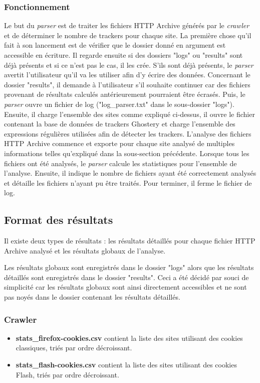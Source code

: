 \subsubsection{Fonctionnement}
Le but du \textit{parser} est de traiter les fichiers HTTP Archive générés par le \textit{crawler} et de déterminer le nombre de trackers pour chaque site. La première chose qu'il fait à son lancement est de vérifier que le dossier donné en argument est accessible en écriture. Il regarde ensuite si des dossiers "logs" ou "results" sont déjà présents et si ce n'est pas le cas, il les crée. S'ils sont déjà présents, le \textit{parser} avertit l'utilisateur qu'il va les utiliser afin d'y écrire des données. Concernant le dossier "results", il demande à l'utilisateur s'il souhaite continuer car des fichiers provenant de résultats calculés antérieurement pourraient être écrasés. Puis, le \textit{parser} ouvre un fichier de log ("log\_parser.txt" dans le sous-dossier "logs"). Ensuite, il charge l'ensemble des sites comme expliqué ci-dessus, il ouvre le fichier contenant la base de données de trackers Ghostery et charge l'ensemble des expressions régulières utilisées afin de détecter les trackers. L'analyse des fichiers HTTP Archive commence et exporte pour chaque site analysé de multiples informations telles qu'expliqué dans la sous-section précédente. Lorsque tous les fichiers ont été analysés, le \textit{parser} calcule les statistiques pour l'ensemble de l'analyse. Ensuite, il indique le nombre de fichiers ayant été correctement analysés et détaille les fichiers n'ayant pu être traités. Pour terminer, il ferme le fichier de log.

\subsection{Format des résultats}
Il existe deux types de résultats : les résultats détaillés pour chaque fichier HTTP Archive analysé et les résultats globaux de l'analyse.

Les résultats globaux sont enregistrés dans le dossier "logs" alors que les résultats détaillés sont enregistrés dans le dossier "results".
Ceci a été décidé par souci de simplicité car les résultats globaux sont ainsi directement accessibles et ne sont pas noyés dans le dossier contenant les résultats détaillés.

\subsubsection{Crawler}
\begin{itemize}
	\item \textbf{stats\_firefox-cookies.csv} contient la liste des sites utilisant des cookies classiques, triés par ordre décroissant.
	\item \textbf{stats\_flash-cookies.csv} contient la liste des sites utilisant des cookies Flash, triés par ordre décroissant.
\end{itemize}

